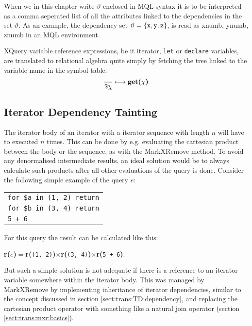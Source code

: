 When we in this chapter write $\vartheta$ enclosed in MQL syntax it is to be interpreted as a comma seperated list
of all the attributes linked to the dependencies in the set $\vartheta$. As an example, the dependency set
$\vartheta = \left\{\mbox{\texttt{x}},\mbox{\texttt{y}},\mbox{\texttt{z}}\right\}$, is read as \textsf{xnumb,
ynumb, znumb} in an MQL environment.

XQuery variable reference expressions, be it iterator, \texttt{let} or \texttt{declare} variables, are translated
to relational algebra quite simply by fetching the tree linked to the variable name in the symbol table:
\begin{equation}
\frac{}{\mbox{\texttt{\$}}\chi}\longmapsto
\mbox{\textbf{get(}}\chi\mbox{\textbf{)}}
\label{rule:trans:TD:varRef}
\end{equation}


\subsection{Iterator Dependency Tainting}
\label{sect:trans:TD:tainting}

The iterator body of an iterator with a iterator sequence with length $n$ will have to executed $n$ times. This
can be done by e.g. evaluating the cartesian product between the body or the sequence, as with the MarkXRemove
method. To avoid any denormalised intermediate results, an ideal solution would be to always calculate such
products after all other evaluations of the query is done. Consider the following simple example of the query $e$:

\begin{center}
\begin{tabular}{l}
\texttt{for \$a in (1, 2) return} \\ \qquad
\texttt{for \$b in (3, 4) return} \\ \qquad \qquad
\texttt{5 + 6}
\end{tabular}
\end{center}

For this query the result can be calculated like this:
\noindent
\begin{center}
\textbf{r(}$e$\textbf{)}$=$\textbf{r(}\texttt{(1, 2)}\textbf{)}$\times$\textbf{r(}\texttt{(3,
4)}\textbf{)}$\times$\textbf{r(}\texttt{5 + 6}\textbf{)}.
\end{center}
\noindent

But such a simple solution is not adequate if there is a reference to an iterator variable somewhere within the
iterator body. This was managed by MarkXRemove by implementing inheritance of iterator dependencies, similar to
the concept discussed in section \ref{sect:trans:TD:dependency}, and replacing the cartesian product operator with
something like a natural join operator (section \ref{sect:trans:mxr:basics}).

